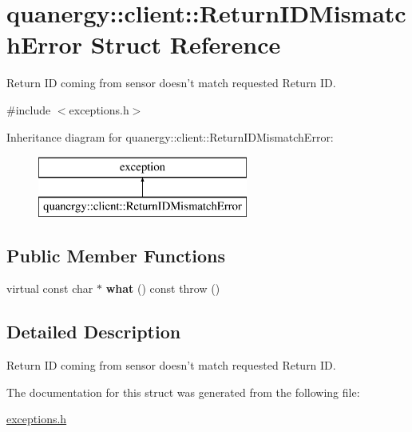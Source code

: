 \hypertarget{structquanergy_1_1client_1_1ReturnIDMismatchError}{\section{quanergy\-:\-:client\-:\-:Return\-I\-D\-Mismatch\-Error Struct Reference}
\label{structquanergy_1_1client_1_1ReturnIDMismatchError}
}


Return I\-D coming from sensor doesn't match requested Return I\-D.  




{\ttfamily \#include $<$exceptions.\-h$>$}

Inheritance diagram for quanergy\-:\-:client\-:\-:Return\-I\-D\-Mismatch\-Error\-:\begin{figure}[H]
\begin{center}
\leavevmode
\includegraphics[height=2.000000cm]{structquanergy_1_1client_1_1ReturnIDMismatchError}
\end{center}
\end{figure}
\subsection*{Public Member Functions}
\begin{DoxyCompactItemize}
\item 
\hypertarget{structquanergy_1_1client_1_1ReturnIDMismatchError_a96071210e8a73c35fb54f4fb0d475925}{virtual const char $\ast$ {\bfseries what} () const   throw ()}\label{structquanergy_1_1client_1_1ReturnIDMismatchError_a96071210e8a73c35fb54f4fb0d475925}

\end{DoxyCompactItemize}


\subsection{Detailed Description}
Return I\-D coming from sensor doesn't match requested Return I\-D. 

The documentation for this struct was generated from the following file\-:\begin{DoxyCompactItemize}
\item 
\hyperlink{exceptions_8h}{exceptions.\-h}\end{DoxyCompactItemize}
